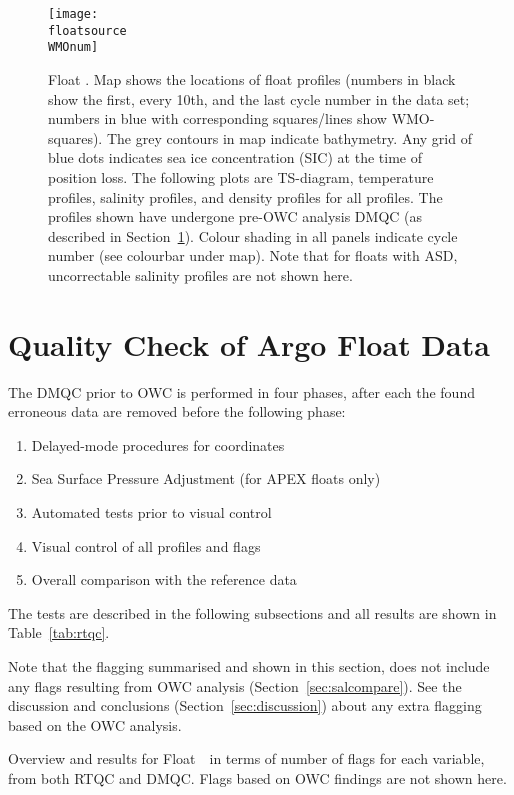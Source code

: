 \documentclass{article}
\begin{document}
\begin{figure}[hp]
  \centerline{\texttt{[image: \\floatsource\\WMOnum]}}
  \caption{Float \WMOnum. Map shows the locations of float profiles (numbers in
    black show the first, every 10th, and the last cycle number in the
    data set; numbers in blue with corresponding squares/lines show
    WMO-squares). The grey contours in map indicate bathymetry. Any grid
    of blue dots indicates sea ice concentration (SIC) at the time of
    position loss. The following plots are TS-diagram, temperature
    profiles, salinity profiles, and density profiles for all profiles.
    The profiles shown have undergone pre-OWC analysis DMQC (as described
    in Section~\protect\ref{DMQCpreOWC}).  Colour shading in all panels
    indicate cycle number (see colourbar under map).  Note that for floats
    with ASD, uncorrectable salinity profiles are not shown here.}
  \label{fig:float-info}
\end{figure} 
 
        
\newpage
\section{Quality Check of Argo Float Data}\label{DMQCpreOWC}
%
The DMQC prior to OWC is performed in four phases, after each the found
erroneous data are removed before the following phase:
\begin{enumerate}
\item Delayed-mode procedures for coordinates
\item Sea Surface Pressure Adjustment (for APEX floats only)
\item Automated tests prior to visual control
\item Visual control of all profiles and flags
\item Overall comparison with the reference data
\end{enumerate}
The tests are described in the following subsections and all results are
shown in Table~\ref{tab:rtqc}.
%
%

% 
Note that the flagging summarised and shown in this section, does not
include any flags resulting from OWC analysis (Section~\ref{sec:salcompare}). See
the discussion and conclusions (Section~\ref{sec:discussion}) about any
extra flagging based on the OWC analysis.
%
\begin{table}[!ht]
  \caption{Overview and results for Float~\WMOnum\ in terms of number of
    flags for each variable, from both RTQC and DMQC. 
    Flags based on OWC findings are not shown here.}
  \label{tab:rtqc}
  \centering
  
\end{table}     
\end{document}
